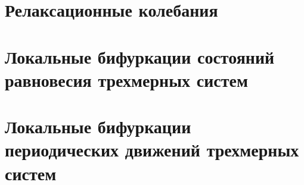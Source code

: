 \begin{multicols*}{2}
		\section{Релаксационные колебания}

		\section{Локальные бифуркации состояний равновесия трехмерных систем}

		\section{Локальные бифуркации периодических движений трехмерных систем}

	\end{multicols*}

